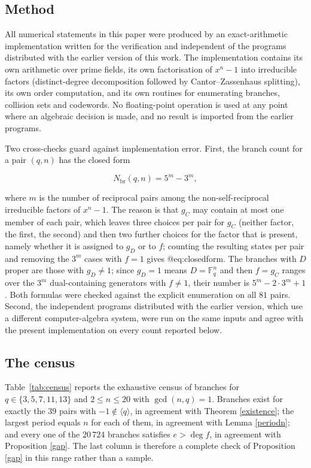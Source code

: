 \documentclass[11pt,reqno]{amsart}
\theoremstyle{definition}
\theoremstyle{remark}
\newcommand{\F}{\mathbb{F}}
\newcommand{\gen}[1]{\langle #1\rangle}
\begin{document}
\subsection{Method}

All numerical statements in this paper were produced by an exact-arithmetic implementation written for the verification and independent of the programs distributed with the earlier version of this work. The implementation contains its own arithmetic over prime fields, its own factorisation of $x^n-1$ into irreducible factors (distinct-degree decomposition followed by Cantor--Zassenhaus splitting), its own order computation, and its own routines for enumerating branches, collision sets and codewords. No floating-point operation is used at any point where an algebraic decision is made, and no result is imported from the earlier programs.


Two cross-checks guard against implementation error. First, the branch count for a pair $(q,n)$ has the closed form


\begin{equation}\label{eq:closedform}
N_{\text{br}}(q,n)=5^{m}-3^{m},
\end{equation}

where $m$ is the number of reciprocal pairs among the non-self-reciprocal irreducible factors of $x^n-1$. The reason is that $g_C$ may contain at most one member of each pair, which leaves three choices per pair for $g_C$ (neither factor, the first, the second) and then two further choices for the factor that is present, namely whether it is assigned to $g_D$ or to $f$; counting the resulting states per pair and removing the $3^m$ cases with $f=1$ gives @eq:closedform. The branches with $D$ proper are those with $g_D\neq1$; since $g_D=1$ means $D=\F_q^n$ and then $f=g_C$ ranges over the $3^m$ dual-containing generators with $f\neq1$, their number is $5^m-2\cdot3^m+1$. Both formulas were checked against the explicit enumeration on all $81$ pairs. Second, the independent programs distributed with the earlier version, which use a different computer-algebra system, were run on the same inputs and agree with the present implementation on every count reported below.


\subsection{The census}

Table~\ref{tab:census} reports the exhaustive census of branches for $q\in\{3,5,7,11,13\}$ and $2\le n\le20$ with $\gcd(n,q)=1$. Branches exist for exactly the $39$ pairs with $-1\notin\gen{q}$, in agreement with Theorem \ref{existence}; the largest period equals $n$ for each of them, in agreement with Lemma \ref{periodn}; and every one of the $20\,724$ branches satisfies $e>\deg f$, in agreement with Proposition \ref{gap}. The last column is therefore a complete check of Proposition \ref{gap} in this range rather than a sample.
\end{document}
